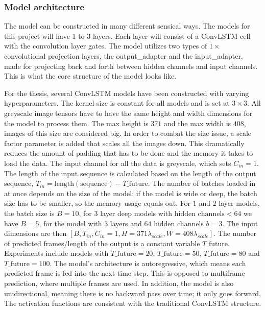\documentclass[a4paper,12pt]{article}
\begin{document}
\subsubsection{Model architecture}
The model can be constructed in many different sensical ways. The models for this project will have $1$ to $3$ layers. Each layer will consist of a ConvLSTM cell with the convolution layer gates. The model utilizes two types of $1 \times $ convolutional projection layers, the output\_adapter and the input\_adapter, made for projecting back and forth between hidden channels and input channels. This is what the core structure of the model looks like.


For the thesis, several ConvLSTM models have been constructed with varying hyperparameters. The kernel size is constant for all models and is set at $3 \times 3$. All greyscale image tensors have to have the same height and width dimensions for the model to process them. The max height is $371$ and the max width is $408$, images of this size are considered big. In order to combat the size issue, a scale factor parameter is added that scales all the images down. This dramatically reduces the amount of padding that has to be done and the memory it takes to load the data.
The input channel for all the data is greyscale, which sets $C_{in} = 1$. The length of the input sequence is calculated based on the length of the output sequence, $T_{in} = \text{length}(\text{sequence}) - T\_\text{future}$. The number of batches loaded in at once depends on the size of the model; if the model is wide or deep, the batch size has to be smaller, so the memory usage equals out. For $1$ and $2$ layer models, the batch size is $B=10$, for $3$ layer deep models with $\text{hidden channels}<64$ we have $B=5$, for the model with $3$ layers and $64$ hidden channels $b=3$. The input dimensions are then $[B, T_{in}, C_{in}=1, H=371\lambda_{scale}, W=408\lambda_{scale}]$.
The number of predicted frames/length of the output is a constant variable $T\_\text{future}$. Experiments include models with $T\_\text{future} = 20$, $T\_\text{future} = 50$, $T\_\text{future} = 80$ and $T\_\text{future} = 100$. The model's architecture is autoregressive, which means each predicted frame is fed into the next time step. This is opposed to multiframe prediction, where multiple frames are used. In addition, the model is also unidirectional, meaning there is no backward pass over time; it only goes forward. The activation functions are consistent with the traditional ConvLSTM structure.
\end{document}
